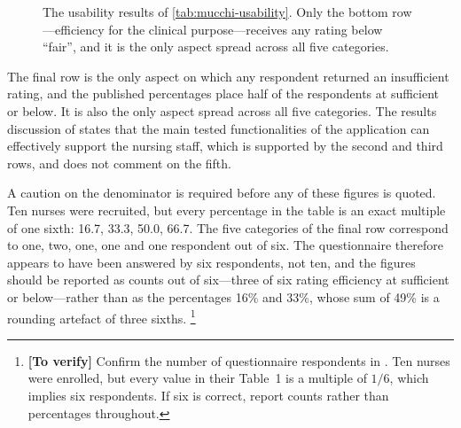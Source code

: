 \documentclass[12pt,a4paper,oneside]{report}
\newcommand{\verify}[1]{\footnote{\textbf{[To verify]} #1}}
\begin{document}
\begin{figure}[htbp]
\centering
{}
\caption{The usability results of \cref{tab:mucchi-usability}. Only the bottom row---efficiency for the clinical purpose---receives any rating below ``fair'', and it is the only aspect spread across all five categories.}\label{fig:usability}
\end{figure}

The final row is the only aspect on which any respondent returned an insufficient rating, and the published percentages place half of the respondents at sufficient or below. It is also the only aspect spread across all five categories. The results discussion of \textcite{mucchi2021} states that the main tested functionalities of the application can effectively support the nursing staff, which is supported by the second and third rows, and does not comment on the fifth.

A caution on the denominator is required before any of these figures is quoted. Ten nurses were recruited, but every percentage in the table is an exact multiple of one sixth: 16.7, 33.3, 50.0, 66.7. The five categories of the final row correspond to one, two, one, one and one respondent out of six. The questionnaire therefore appears to have been answered by six respondents, not ten, and the figures should be reported as counts out of six---three of six rating efficiency at sufficient or below---rather than as the percentages 16\% and 33\%, whose sum of 49\% is a rounding artefact of three sixths.%
\verify{Confirm the number of questionnaire respondents in \textcite{mucchi2021}. Ten nurses were enrolled, but every value in their Table~1 is a multiple of $1/6$, which implies six respondents. If six is correct, report counts rather than percentages throughout.}
\end{document}

